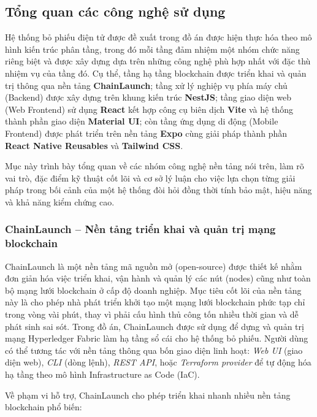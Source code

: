 \subsection{Tổng quan các công nghệ sử dụng}

Hệ thống bỏ phiếu điện tử được đề xuất trong đồ án được hiện thực hóa theo mô hình kiến trúc phân tầng, trong đó mỗi tầng đảm nhiệm một nhóm chức năng riêng biệt và được xây dựng dựa trên những công nghệ phù hợp nhất với đặc thù nhiệm vụ của tầng đó. Cụ thể, tầng hạ tầng blockchain được triển khai và quản trị thông qua nền tảng \textbf{ChainLaunch}; tầng xử lý nghiệp vụ phía máy chủ (Backend) được xây dựng trên khung kiến trúc \textbf{NestJS}; tầng giao diện web (Web Frontend) sử dụng \textbf{React} kết hợp công cụ biên dịch \textbf{Vite} và hệ thống thành phần giao diện \textbf{Material UI}; còn tầng ứng dụng di động (Mobile Frontend) được phát triển trên nền tảng \textbf{Expo} cùng giải pháp thành phần \textbf{React Native Reusables} và \textbf{Tailwind CSS}.

Mục này trình bày tổng quan về các nhóm công nghệ nền tảng nói trên, làm rõ vai trò, đặc điểm kỹ thuật cốt lõi và cơ sở lý luận cho việc lựa chọn từng giải pháp trong bối cảnh của một hệ thống đòi hỏi đồng thời tính bảo mật, hiệu năng và khả năng kiểm chứng cao.

\subsubsection{ChainLaunch -- Nền tảng triển khai và quản trị mạng blockchain}

ChainLaunch là một nền tảng mã nguồn mở (open-source) được thiết kế nhằm đơn giản hóa việc triển khai, vận hành và quản lý các nút (nodes) cũng như toàn bộ mạng lưới blockchain ở cấp độ doanh nghiệp. Mục tiêu cốt lõi của nền tảng này là cho phép nhà phát triển khởi tạo một mạng lưới blockchain phức tạp chỉ trong vòng vài phút, thay vì phải cấu hình thủ công tốn nhiều thời gian và dễ phát sinh sai sót. Trong đồ án, ChainLaunch được sử dụng để dựng và quản trị mạng Hyperledger Fabric làm hạ tầng sổ cái cho hệ thống bỏ phiếu. Người dùng có thể tương tác với nền tảng thông qua bốn giao diện linh hoạt: \textit{Web UI} (giao diện web), \textit{CLI} (dòng lệnh), \textit{REST API}, hoặc \textit{Terraform provider} để tự động hóa hạ tầng theo mô hình Infrastructure as Code (IaC).

Về phạm vi hỗ trợ, ChainLaunch cho phép triển khai nhanh nhiều nền tảng blockchain phổ biến:

